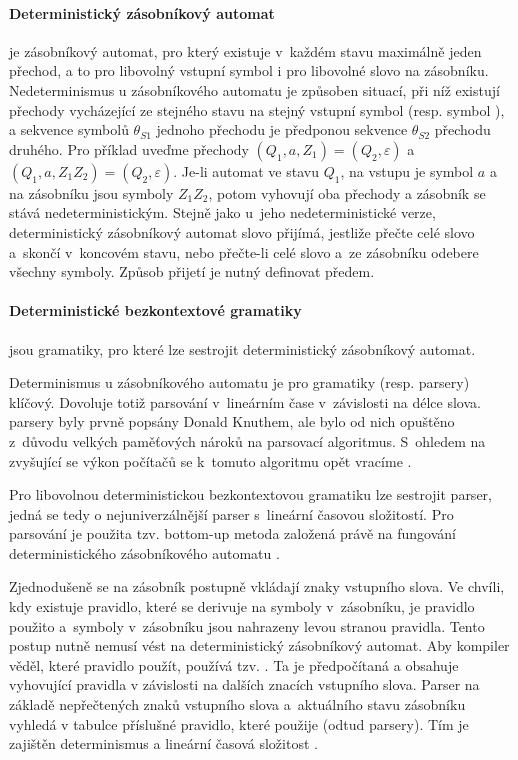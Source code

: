 			\paragraph{Deterministický zásobníkový automat}
			je zásobníkový automat, pro kte\-rý existuje v~každém stavu maximálně jeden přechod, a to pro libovolný vstupní symbol i pro libovolné slovo na zásobníku.
			Nedeterminismus u zásobníkového automatu je způsoben situací, při níž existují přechody vycházející ze stejného stavu na stejný vstupní symbol (resp. symbol \Eps), a sekvence symbolů $\theta_{S1}$ jednoho přechodu je předponou sekvence $\theta_{S2}$ přechodu druhého. Pro příklad uveďme přechody $(Q_1 , a , Z_1) = (Q_2 , \varepsilon)$ a $(Q_1 , a , Z_1 Z_2 ) = (Q_2 , \varepsilon)$. Je-li automat ve stavu $Q_1$, na vstupu je symbol $a$ a na zásobníku jsou symboly $Z_1 Z_2$, potom vyhovují oba přechody a zásobník se stává nedeterministickým.
			Stejně jako u~jeho nedeterministické verze, deterministický zásobníkový automat slovo přijímá, jestliže přečte celé slovo a~skončí v~koncovém stavu, nebo přečte-li celé slovo a~ze zásobníku odebere všechny symboly. Způsob přijetí je nutný definovat předem.
			\paragraph{Deterministické bezkontextové gramatiky}
			jsou gramatiky, pro které lze sestrojit deterministický zásobníkový automat.
			
			\vspace{1em}
			
			Determinismus u zásobníkového automatu je pro \LRk gramatiky (resp. \LRk parsery) klíčový. Dovoluje totiž parsování v~lineárním čase v~závislosti na délce slova. \LRk parsery byly prvně popsány Donald Knuthem,
			ale bylo od nich opuštěno z~důvodu velkých paměťových nároků na parsovací algoritmus. S~ohledem na zvyšující se výkon počítačů se k~tomuto algoritmu opět vracíme \cite{Chapman:1987:LPT:40693}.
			
			Pro libovolnou deterministickou bezkontextovou gramatiku lze sestrojit \LRk parser, jedná se tedy o nejuniverzálnější parser s~lineární časovou složitostí. Pro parsování je použita tzv. bottom-up metoda založená právě na fungování deterministického zásobníkového automatu \cite{Chapman:1987:LPT:40693}. 
			
			Zjednodušeně se na zásobník postupně vkládají znaky vstupního slova. Ve chvíli, kdy existuje pravidlo, které se derivuje na symboly v~zásobníku, je pravidlo použito a~symboly v~zásobníku jsou nahrazeny levou stranou pravidla. Tento postup nutně nemusí vést na deterministický zásobníkový automat. Aby kompiler věděl, které pravidlo použít, používá tzv. . Ta je předpočítaná a obsahuje vyhovující pravidla v závislosti na dalších znacích vstupního slova. Parser na základě  nepřečtených znaků vstupního slova a~aktuálního stavu zásobníku vyhledá v tabulce příslušné pravidlo, které použije (odtud \LRk parsery). Tím je zajištěn determinismus a lineární časová složitost \cite{Meduna:2014:FLC:2636678}. 
		
